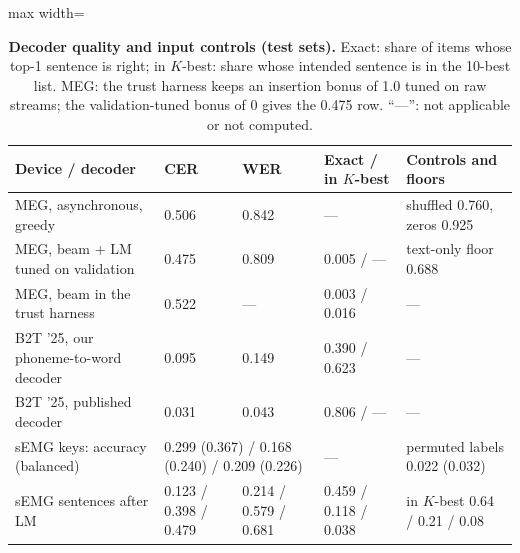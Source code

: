 \begin{table}[H]
  \centering
  \caption{\textbf{Decoder quality and input controls (test sets).} Exact: share of items whose top-1 sentence is right; in $K$-best: share whose intended sentence is in the 10-best list. MEG: the trust harness keeps an insertion bonus of 1.0 tuned on raw streams; the validation-tuned bonus of 0 gives the 0.475 row. ``---'': not applicable or not computed.}
  \label{tab:decoders}
  \small
  \begin{adjustbox}{max width=\linewidth}\begin{tabular}{@{}lllll@{}}
    \toprule
    \textbf{Device / decoder} & \textbf{CER} & \textbf{WER} & \textbf{Exact / in $K$-best} & \textbf{Controls and floors} \\
    \midrule
    MEG, asynchronous, greedy & 0.506 & 0.842 & --- & shuffled 0.760, zeros 0.925 \\
    MEG, beam + LM tuned on validation & 0.475 & 0.809 & 0.005 / --- & text-only floor 0.688 \\
    MEG, beam in the trust harness & 0.522 & --- & 0.003 / 0.016 & --- \\
    \midrule
    B2T '25, our phoneme-to-word decoder & 0.095 & 0.149 & 0.390 / 0.623 & --- \\
    B2T '25, published decoder & 0.031 & 0.043 & 0.806 / --- & --- \\
    \midrule
    sEMG keys: accuracy (balanced) & \multicolumn{2}{l}{0.299 (0.367) / 0.168 (0.240) / 0.209 (0.226)} & --- & permuted labels 0.022 (0.032) \\
    sEMG sentences after LM & 0.123 / 0.398 / 0.479 & 0.214 / 0.579 / 0.681 & 0.459 / 0.118 / 0.038 & in $K$-best 0.64 / 0.21 / 0.08 \\
    \bottomrule
  \end{tabular}\end{adjustbox}
\end{table}

